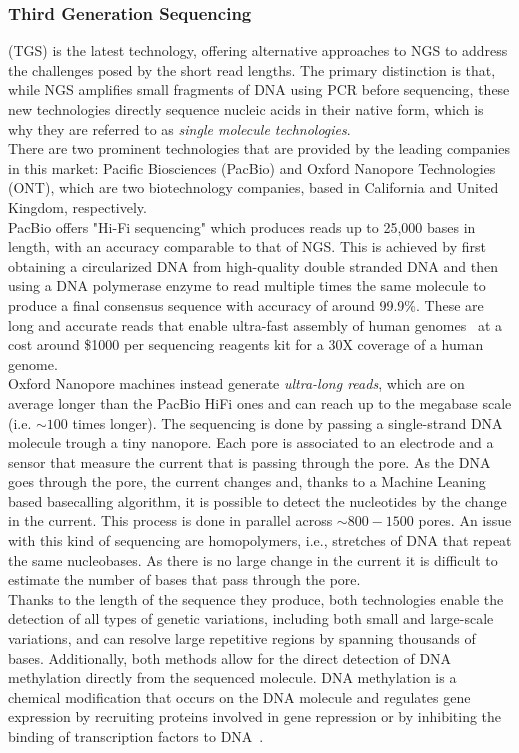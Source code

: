 \subsubsection{Third Generation Sequencing} (\gls{TGS}) is the latest technology, offering alternative approaches to NGS to address the challenges posed by the short read lengths. The primary distinction is that, while NGS amplifies small fragments of DNA using \gls{PCR} before sequencing, these new technologies directly sequence nucleic acids in their native form, which is why they are referred to as \emph{single molecule technologies}.\\
There are two prominent technologies that are provided by the leading companies in this market: Pacific Biosciences (PacBio) and Oxford Nanopore Technologies (\gls{ONT}), which are two biotechnology companies, based in California and United Kingdom, respectively. \\
PacBio offers "Hi-Fi sequencing" which produces reads up to 25,000 bases in length, with an accuracy comparable to that of NGS. This is achieved by first obtaining a circularized DNA from high-quality double stranded DNA and then using a DNA polymerase enzyme to read multiple times the same molecule to produce a final consensus sequence with accuracy of around 99.9\%. These are long and accurate reads that enable ultra-fast assembly of human genomes~\cite{mdbg} at a cost around \$1000 per sequencing reagents kit for a 30X coverage of a human genome.\\
Oxford Nanopore machines instead generate \emph{ultra-long reads}, which are on average longer than the PacBio HiFi ones and can reach up to the megabase scale (i.e. $\sim100$ times longer). The sequencing is done by passing a single-strand DNA molecule trough a tiny nanopore. Each pore is associated to an electrode and a sensor that measure the current that is passing through the pore. As the DNA goes through the pore, the current changes and, thanks to a Machine Leaning based basecalling algorithm, it is possible to detect the nucleotides by the change in the current. This process is done in parallel across $\sim800-1500$ pores. An issue with this kind of sequencing are homopolymers, i.e., stretches of DNA that repeat the same nucleobases. As there is no large change in the current it is difficult to estimate the number of bases that pass through the pore.\\
Thanks to the length of the sequence they produce, both technologies enable the detection of all types of genetic variations, including both small and large-scale variations, and can resolve large repetitive regions by spanning thousands of bases. Additionally, both methods allow for the direct detection of DNA methylation directly from the sequenced molecule. DNA methylation is a chemical modification that occurs on the DNA molecule and regulates gene expression by recruiting proteins involved in gene repression or by inhibiting the binding of transcription factors to DNA~\cite{methylation}. \\
